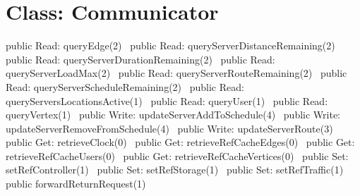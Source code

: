 \section*{Class: Communicator}
\nwenddocs{}\endmoddef{}
public \LA{}Read: queryEdge(2)~{\nwtagstyle{}}\RA{}
public \LA{}Read: queryServerDistanceRemaining(2)~{\nwtagstyle{}}\RA{}
public \LA{}Read: queryServerDurationRemaining(2)~{\nwtagstyle{}}\RA{}
public \LA{}Read: queryServerLoadMax(2)~{\nwtagstyle{}}\RA{}
public \LA{}Read: queryServerRouteRemaining(2)~{\nwtagstyle{}}\RA{}
public \LA{}Read: queryServerScheduleRemaining(2)~{\nwtagstyle{}}\RA{}
public \LA{}Read: queryServersLocationsActive(1)~{\nwtagstyle{}}\RA{}
public \LA{}Read: queryUser(1)~{\nwtagstyle{}}\RA{}
public \LA{}Read: queryVertex(1)~{\nwtagstyle{}}\RA{}
\nwendcode{}\nwdocspar
{}
\nwenddocs{}\plusendmoddef
public \LA{}Write: updateServerAddToSchedule(4)~{\nwtagstyle{}}\RA{}
public \LA{}Write: updateServerRemoveFromSchedule(4)~{\nwtagstyle{}}\RA{}
public \LA{}Write: updateServerRoute(3)~{\nwtagstyle{}}\RA{}
\nwendcode{}\nwdocspar
{}
\nwenddocs{}\plusendmoddef
public \LA{}Get: retrieveClock(0)~{\nwtagstyle{}}\RA{}
public \LA{}Get: retrieveRefCacheEdges(0)~{\nwtagstyle{}}\RA{}
public \LA{}Get: retrieveRefCacheUsers(0)~{\nwtagstyle{}}\RA{}
public \LA{}Get: retrieveRefCacheVertices(0)~{\nwtagstyle{}}\RA{}
public \LA{}Set: setRefController(1)~{\nwtagstyle{}}\RA{}
public \LA{}Set: setRefStorage(1)~{\nwtagstyle{}}\RA{}
public \LA{}Set: setRefTraffic(1)~{\nwtagstyle{}}\RA{}
public \LA{}forwardReturnRequest(1)~{\nwtagstyle{}}\RA{}
\nwendcode{}\nwdocspar

